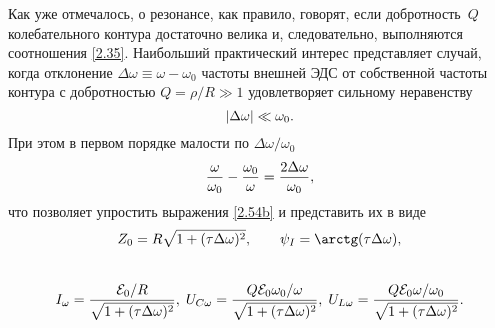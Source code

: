 Как уже отмечалось, о резонансе, как правило, говорят, если добротность~$Q$
колебательного контура достаточно велика и, следовательно, выполняются
соотношения \eqref{2.35}. Наибольший практический интерес представляет случай,
когда отклонение $\Delta\omega\equiv\omega-\omega_0$ частоты внешней ЭДС от
собственной частоты контура с добротностью $Q=\rho/R\gg1$ удовлетворяет сильному
неравенству
\begin{equation}\eqmark{2.58}
	|\Delta\omega|\ll\omega_0.
\end{equation}
При этом в первом порядке малости по  $\Delta\omega/\omega_0$
\begin{equation}\eqmark{2.59}
\dfrac{\omega}{\omega_0}-\dfrac{\omega_0}{\omega}=
\dfrac{2\Delta\omega}{\omega_0},
\end{equation}
что позволяет упростить выражения \eqref{2.54b} и представить их в виде
		\begin{equation}
			\eqmark{2.60a}
			Z_0=R\sqrt{1+(\tau\Delta\omega)^2}, \qquad
\psi_I=\arctg(\tau\Delta\omega),
		\end{equation}\\
		\begin{equation}
			\eqmark{2.60b}
I_{\omega}=\dfrac{\mathcal{E}_0/R}{\sqrt{1+(\tau\Delta\omega)^2}},\;
U_{C\omega}=\dfrac{Q\mathcal{E}_0\omega_0/\omega}{\sqrt{1+(\tau\Delta\omega)^2}},\;
U_{L\omega}=
\dfrac{Q\mathcal{E}_0\omega/\omega_0}{\sqrt{1+(\tau\Delta\omega)^2}}.
		\end{equation}

